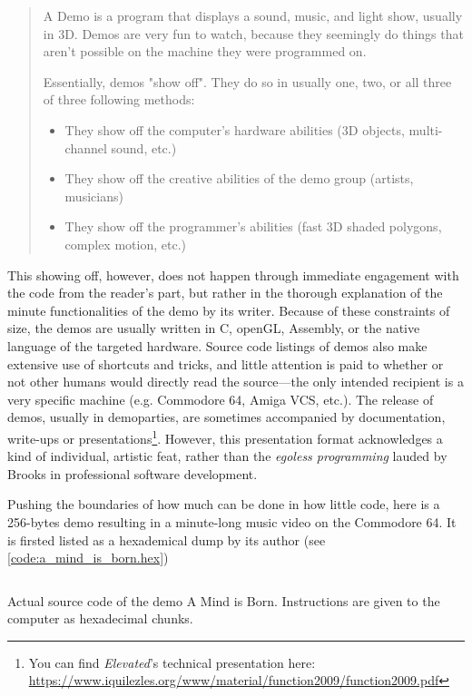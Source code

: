 \begin{quote}
  A Demo is a program that displays a sound, music, and light show, usually in 3D. Demos are very fun to watch, because they seemingly do things that aren't possible on the machine they were programmed on.

  Essentially, demos "show off". They do so in usually one, two, or all three of three following methods:

  \begin{itemize}
    \item{They show off the computer's hardware abilities (3D objects, multi-channel sound, etc.)}
    \item{They show off the creative abilities of the demo group (artists, musicians)}
    \item{They show off the programmer's abilities (fast 3D shaded polygons, complex motion, etc.)}
  \end{itemize}
  \citep{melik_pc_2012}
\end{quote}

This showing off, however, does not happen through immediate engagement with the code from the reader's part, but rather in the thorough explanation of the minute functionalities of the demo by its writer. Because of these constraints of size, the demos are usually written in C, openGL, Assembly, or the native language of the targeted hardware. Source code listings of demos also make extensive use of shortcuts and tricks, and little attention is paid to whether or not other humans would directly read the source—the only intended recipient is a very specific machine (e.g. Commodore 64, Amiga VCS, etc.). The release of demos, usually in demoparties, are sometimes accompanied by documentation, write-ups or presentations\footnote{You can find \emph{Elevated}'s technical presentation here: \url{https://www.iquilezles.org/www/material/function2009/function2009.pdf}}. However, this presentation format acknowledges a kind of individual, artistic feat, rather than the \emph{egoless programming} lauded by Brooks in professional software development.

Pushing the boundaries of how much can be done in how little code, here is a 256-bytes demo resulting in a minute-long music video \citep{akesson_mind_2017} on the Commodore 64. It is firsted listed as a hexademical dump by its author (see \ref{code:a_mind_is_born.hex})

\begin{listing}
  \inputminted{hexdump}{./corpus/a_mind_is_born.hex}
  \caption{Actual source code of the demo A Mind is Born. Instructions are given to the computer as hexadecimal chunks.}
  \label{code:a_mind_is_born.hex}
\end{listing}

